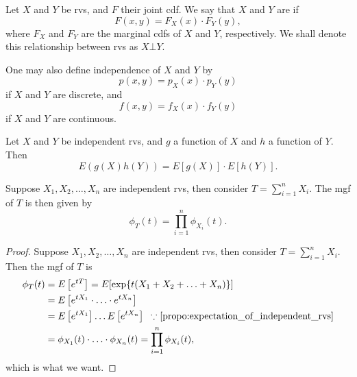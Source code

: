 \documentclass[notoc,notitlepage]{tufte-book}
\begin{document}
\begin{defn}[Independence]\label{defn:independence}
  Let $X$ and $Y$ be rvs, and $F$ their joint cdf. We say that $X$ and $Y$ are
   if
  \begin{equation*}
    F(x, y) = F_X(x) \cdot F_Y(y),
  \end{equation*}
  where $F_X$ and $F_Y$ are the marginal cdfs of $X$ and $Y$, respectively. We
  shall denote this relationship between rvs as $X \bot Y$.
\end{defn}

\begin{note}
  One may also define independence of $X$ and $Y$ by
  \begin{equation*}
    p(x, y) = p_X(x) \cdot p_Y(y)
  \end{equation*}
  if $X$ and $Y$ are discrete, and
  \begin{equation*}
    f(x, y) = f_X(x) \cdot f_Y(y)
  \end{equation*}
  if $X$ and $Y$ are continuous.
\end{note}

\begin{propo}\label{propo:expectation_of_independent_rvs}
  Let $X$ and $Y$ be independent rvs, and $g$ a function of $X$ and $h$ a
  function of $Y$. Then
  \begin{equation*}
    E(g(X) h(Y)) = E[g(X)] \cdot E[h(Y)].
  \end{equation*}
\end{propo}

\begin{crly}\label{crly:mgf_of_independent_rvs}
  Suppose $X_1, X_2, \ldots, X_n$ are independent rvs, then consider $T =
  \sum_{i=1}^{n} X_i$. The mgf of $T$ is then given by
  \begin{equation*}
    \phi_T(t) = \prod_{i=1}^{n} \phi_{X_i}(t).
  \end{equation*}
\end{crly}

\begin{proof}
  Suppose $X_1, X_2, \ldots, X_n$ are independent rvs, then consider $T =
  \sum_{i=1}^{n} X_i$. Then the mgf of $T$ is
  \begin{align*}
    \phi_T(t) &= E\left[e^{tT}\right] = E[\exp\{t(X_1 + X_2 + \hdots + X_n)\}] \\
              &= E \left[ e^{tX_1} \cdot \hdots \cdot e^{tX_n} \right] \\
              &= E \left[ e^{tX_1} \right] \hdots E \left[ e^{tX_n} \right]
              \enspace \because \cref{propo:expectation_of_independent_rvs} \\
              &= \phi_{X_1}(t) \cdot \hdots \cdot \phi_{X_n}(t) =
              \prod_{i=1}^{n} \phi_{X_i}(t),
  \end{align*}
  which is what we want.
\end{proof}
\end{document}
